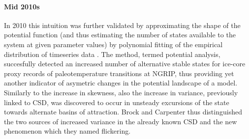 \documentclass[../main.tex]{subfiles}
\begin{document}
\paragraph{Mid 2010s}
In 2010 this intuition was further validated by approximating the shape of the potential function (and thus estimating the number of states available to the system at given parameter values) by polynomial fitting of the empirical distribution of timeseries data \cite{Livina10}. 
The method, termed potential analysis, succesfully detected an increased number of alternative stable states for ice-core proxy records of paleotemperature transitions at NGRIP, thus providing yet another indicator of asymetric changes in the potential landscape of a model. 
Similarly to the increase in skewness, also the increase in variance, previously linked to CSD, was discovered to occur in unsteady excursions of the state towards alternate basins of attraction. Brock and Carpenter \cite{Brock10} thus distinguished the two sources of increased variance in the already known CSD and the new phenomenon which they named flickering. 
\end{document}
